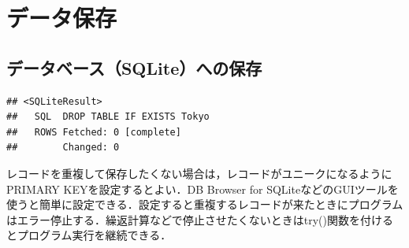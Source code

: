 \documentclass[
]{article}
\newenvironment{Shaded}{\begin{snugshade}}{\end{snugshade}}
\newcommand{\AttributeTok}[1]{\textcolor[rgb]{0.77,0.63,0.00}{#1}}
\newcommand{\CommentTok}[1]{\textcolor[rgb]{0.56,0.35,0.01}{\textit{#1}}}
\newcommand{\FunctionTok}[1]{\textcolor[rgb]{0.00,0.00,0.00}{#1}}
\newcommand{\NormalTok}[1]{#1}
\newcommand{\OtherTok}[1]{\textcolor[rgb]{0.56,0.35,0.01}{#1}}
\newcommand{\SpecialCharTok}[1]{\textcolor[rgb]{0.00,0.00,0.00}{#1}}
\newcommand{\StringTok}[1]{\textcolor[rgb]{0.31,0.60,0.02}{#1}}
\begin{document}
\hypertarget{ux30c7ux30fcux30bfux4fddux5b58}{%
\section{データ保存}\label{ux30c7ux30fcux30bfux4fddux5b58}}

\hypertarget{ux30c7ux30fcux30bfux30d9ux30fcux30b9sqliteux3078ux306eux4fddux5b58}{%
\subsection{データベース（SQLite）への保存}\label{ux30c7ux30fcux30bfux30d9ux30fcux30b9sqliteux3078ux306eux4fddux5b58}}

\begin{Shaded}
\end{Shaded}

\begin{verbatim}
## <SQLiteResult>
##   SQL  DROP TABLE IF EXISTS Tokyo
##   ROWS Fetched: 0 [complete]
##        Changed: 0
\end{verbatim}

\begin{Shaded}
\end{Shaded}

レコードを重複して保存したくない場合は，レコードがユニークになるように
PRIMARY KEYを設定するとよい．DB Browser for
SQLiteなどのGUIツールを使うと簡単に設定できる．設定すると重複するレコードが来たときにプログラムはエラー停止する．繰返計算などで停止させたくないときはtry()関数を付けるとプログラム実行を継続できる．
\end{document}
